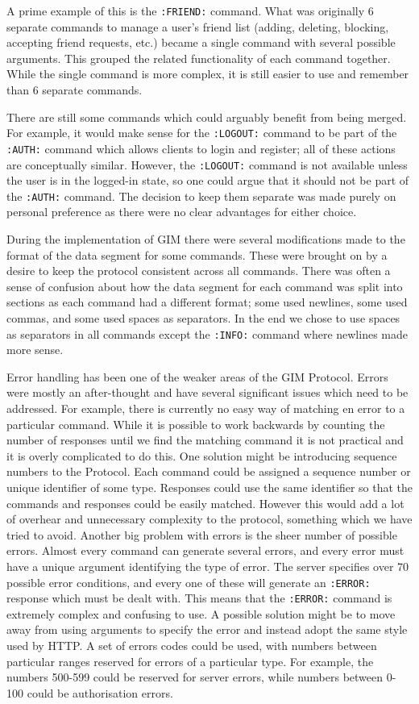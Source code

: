 A prime example of this is the \texttt{:FRIEND:} command. What was originally 6 separate commands to manage a user's friend list (adding, deleting, blocking, accepting friend requests, etc.) became a single command with several possible arguments. This grouped the related functionality of each command together. While the single command is more complex, it is still easier to use and remember than 6 separate commands.

There are still some commands which could arguably benefit from being merged. For example, it would make sense for the \texttt{:LOGOUT:} command to be part of the \texttt{:AUTH:} command which allows clients to login and register; all of these actions are conceptually similar. However, the \texttt{:LOGOUT:} command is not available unless the user is in the logged-in state, so one could argue that it should not be part of the \texttt{:AUTH:} command. The decision to keep them separate was made purely on personal preference as there were no clear advantages for either choice. 

During the implementation of GIM there were several modifications made to the format of the data segment for some commands. These were brought on by a desire to keep the protocol consistent across all commands. There was often a sense of confusion about how the data segment for each command was split into sections as each command had a different format; some used newlines, some used commas, and some used spaces as separators. In the end we chose to use spaces as separators in all commands except the \texttt{:INFO:} command where newlines made more sense. 

Error handling has been one of the weaker areas of the GIM Protocol. Errors were mostly an after-thought and have several significant issues which need to be addressed. For example, there is currently no easy way of matching en error to a particular command. While it is possible to work backwards by counting the number of responses until we find the matching command it is not practical and it is overly complicated to do this. One solution might be introducing sequence numbers to the Protocol. Each command could be assigned a sequence number or unique identifier of some type. Responses could use the same identifier so that the commands and responses could be easily matched. However this would add a lot of overhear and unnecessary complexity to the protocol, something which we have tried to avoid. Another big problem with errors is the sheer number of possible errors. Almost every command can generate several errors, and every error must have a unique argument identifying the type of error. The server specifies over 70 possible error conditions, and every one of these will generate an \texttt{:ERROR:} response which must be dealt with. This means that the \texttt{:ERROR:} command is extremely complex and confusing to use. A possible solution might be to move away from using arguments to specify the error and instead adopt the same style used by HTTP. A set of errors codes could be used, with numbers between particular ranges reserved for errors of a particular type. For example, the numbers 500-599 could be reserved for server errors, while numbers between 0-100 could be authorisation errors.

